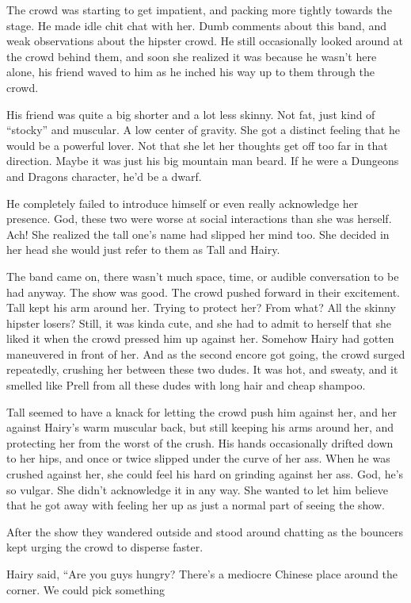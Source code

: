 \documentclass[letterpaper]{article}
\begin{document}
\begin{multicols}{2}
The crowd was starting to get impatient, and packing more tightly towards the stage. He made idle chit chat with her.
Dumb comments about this band, and weak observations about the hipster crowd.
He still occasionally looked around at the crowd behind them, and soon she realized it was because he wasn't here alone, his friend waved to him as he inched his way up to them through the crowd.

His friend was quite a big shorter and a lot less skinny.
Not fat, just kind of ``stocky'' and muscular.
A low center of gravity. She got a distinct feeling that he would be a powerful lover.
Not that she let her thoughts get off too far in that direction.
Maybe it was just his big mountain man beard.
If he were a Dungeons and Dragons character, he'd be a dwarf.

He completely failed to introduce himself or even really acknowledge her presence. God, these two were worse at social interactions than she was herself. Ach!
She realized the tall one's name had slipped her mind too.
She decided in her head she would just refer to them as Tall and Hairy.

The band came on, there wasn't much space, time, or audible conversation to be had anyway.
The show was good. The crowd pushed forward in their excitement.
Tall kept his arm around her. 
Trying to protect her? From what? All the skinny hipster losers?
Still, it was kinda cute, and she had to admit to herself that she liked it when the crowd pressed him up against her.
Somehow Hairy had gotten maneuvered in front of her.
And as the second encore got going, the crowd surged repeatedly, crushing her between these two dudes. It was hot, and sweaty, and it smelled like Prell from all these dudes with long hair and cheap shampoo.

Tall seemed to have a knack for letting the crowd push him against her, and her against Hairy's warm muscular back, but still keeping his arms around her, and protecting her from the worst of the crush. 
His hands occasionally drifted down to her hips, and once or twice slipped under the curve of her ass. 
When he was crushed against her, she could feel his hard on grinding against her ass.
God, he's so vulgar.
She didn't acknowledge it in any way. 
She wanted to let him believe that he got away with feeling her up as just a normal part of seeing the show.

After the show they wandered outside and stood around chatting as the bouncers kept urging the crowd to disperse faster.

Hairy said, ``Are you guys hungry? There's a mediocre Chinese place around the corner. We could pick something 





\end{multicols}
\end{document}
